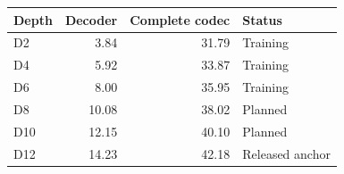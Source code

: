 \begin{tabular}{lrrl}
\toprule
Depth & Decoder & Complete codec & Status \\
\midrule
D2 & 3.84 & 31.79 & Training \\
D4 & 5.92 & 33.87 & Training \\
D6 & 8.00 & 35.95 & Training \\
D8 & 10.08 & 38.02 & Planned \\
D10 & 12.15 & 40.10 & Planned \\
D12 & 14.23 & 42.18 & Released anchor \\
\bottomrule
\end{tabular}
